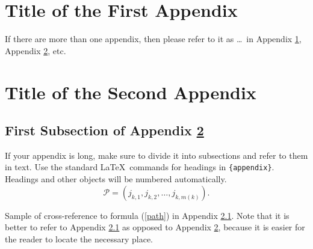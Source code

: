 \documentclass[rbe,fleqn]{econbr}
\begin{document}
\begin{appendix}
\section{Title of the First Appendix}\label{appA}
If there are more than one appendix, then please refer to it as \ldots\ in Appendix \ref{appA}, Appendix \ref{appB}, etc.

\section{Title of the Second Appendix}\label{appB}
\subsection{First Subsection of Appendix \protect\ref{appB}}\label{appB1}

If your appendix is long, make sure to divide it into subsections and refer to them in text. Use the standard \LaTeX\ commands for headings in \verb|{appendix}|. Headings and other objects will be numbered automatically.
\begin{equation}
\mathcal{P}=(j_{k,1},j_{k,2},\dots,j_{k,m(k)}). \label{path}
\end{equation}

Sample of cross-reference to formula (\ref{path}) in Appendix \ref{appB1}. Note that it is better to refer to Appendix \ref{appB1} as opposed to Appendix \ref{appB}, because it is easier for the reader to locate the necessary place.
\end{appendix}
\end{document}
